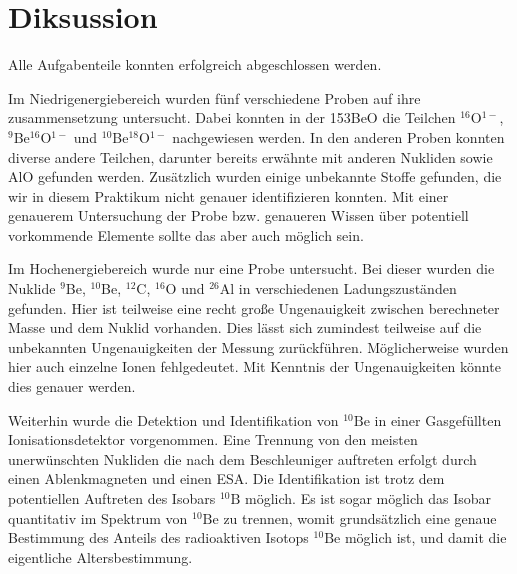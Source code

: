 \section{Diksussion}

Alle Aufgabenteile konnten erfolgreich abgeschlossen werden.

Im Niedrigenergiebereich wurden fünf verschiedene Proben auf ihre zusammensetzung untersucht.
Dabei konnten in der 153BeO die Teilchen $^{16}$O$^{1-}$, $^{9}$Be$^{16}$O$^{1-}$ und $^{10}$Be$^{18}$O$^{1-}$ nachgewiesen werden.
In den anderen Proben konnten diverse andere Teilchen, darunter bereits erwähnte mit anderen Nukliden sowie AlO gefunden werden.
Zusätzlich wurden einige unbekannte Stoffe gefunden, die wir in diesem Praktikum nicht genauer identifizieren konnten.
Mit einer genauerem Untersuchung der Probe bzw. genaueren Wissen über potentiell vorkommende Elemente sollte das aber auch möglich sein.

Im Hochenergiebereich wurde nur eine Probe untersucht.
Bei dieser wurden die Nuklide $^{9}$Be, $^{10}$Be, $^{12}$C, $^{16}$O und $^{26}$Al in verschiedenen Ladungszuständen gefunden.
Hier ist teilweise eine recht große Ungenauigkeit zwischen berechneter Masse und dem Nuklid vorhanden.
Dies lässt sich zumindest teilweise auf die unbekannten Ungenauigkeiten der Messung zurückführen.
Möglicherweise wurden hier auch einzelne Ionen fehlgedeutet.
Mit Kenntnis der Ungenauigkeiten könnte dies genauer werden.

Weiterhin wurde die Detektion und Identifikation von $^{10}\text{Be}$ in einer Gasgefüllten Ionisationsdetektor vorgenommen.
Eine Trennung von den meisten unerwünschten Nukliden die nach dem Beschleuniger auftreten erfolgt durch einen Ablenkmagneten und einen ESA.
Die Identifikation ist trotz dem potentiellen Auftreten des Isobars $^{10}\text{B}$ möglich.
Es ist sogar möglich das Isobar quantitativ im Spektrum von $^{10}\text{Be}$ zu trennen, womit grundsätzlich eine genaue Bestimmung des Anteils des radioaktiven Isotops $^{10}\text{Be}$ möglich ist, und damit die eigentliche Altersbestimmung.

